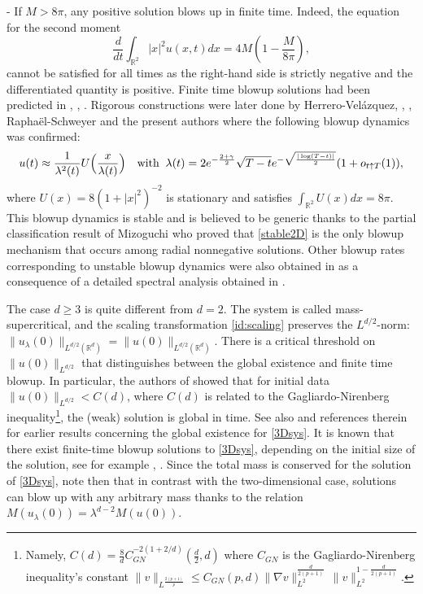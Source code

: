 \documentclass[11pt]{aims}
\theoremstyle{definition}
\newcommand{\Rb}{\mathbb{R}}
\numberwithin{equation}{section}
\begin{document}
- If $M > 8\pi$, any positive solution blows up in finite time. Indeed, the equation for the second moment
$$\frac{d}{dt}\int_{\Rb^2} |x|^2 u(x,t)dx =  4M \left( 1 - \frac{M}{8\pi}\right),$$
cannot be satisfied for all times as the right-hand side is strictly negative and the differentiated quantity is positive. Finite time blowup solutions had been predicted in \cite{Njtb73}, \cite{CPmb81}, \cite{JLtams92}. Rigorous constructions were later done by Herrero-Vel{\'a}zquez, \cite{HVma96}, \cite{Vsiam02}, Rapha\"el-Schweyer \cite{RSma14} and the present authors \cite{CGNNcpam21} where  the following blowup dynamics was confirmed:
\begin{equation}\label{stable2D}
u(t) \approx \frac{1}{\lambda^{2}(t)} U\Big( \frac{x}{\lambda(t)} \Big) \quad \textup{with}\;\; \lambda(t) = 2e^{-\frac{2+ \gamma}{2}}\sqrt{T-t}e^{-\sqrt{\frac{|\log (T-t)|}{2}}} (1 + o_{t \uparrow T}(1)),
\end{equation}
where $U(x) = 8(1 + |x|^2)^{-2}$ is stationary and satisfies $\int_{\Rb^2} U(x)dx = 8\pi$. This blowup dynamics is stable and is believed to be generic thanks to the partial classification result of Mizoguchi \cite{Mcpam20} who proved that \eqref{stable2D} is the only blowup mechanism that occurs among radial nonnegative solutions. Other blowup rates corresponding to unstable blowup dynamics were also obtained in \cite{CGNNcpam21} as a consequence of a detailed spectral analysis obtained in \cite{CGNNarx19a}.  

\bigskip

\noindent The case $d \geq 3$ is quite different from $d = 2$. The system is called mass-supercritical, and the scaling transformation \eqref{id:scaling} preserves the $L^{d/2}$-norm: $\|u_\lambda(0)\|_{L^{d/2}(\Rb^d)} = \|u(0)\|_{L^{d/2}(\Rb^d)}$. There is a critical threshold on $\| u(0)\|_{L^{d/2}}$ that distinguishes between the global existence and finite time blowup. In particular, the authors of \cite{CCEcpde12} showed that for initial data $\|u(0)\|_{L^{d/2}} < C(d)$, where $C(d)$ is related to the Gagliardo-Nirenberg inequality\footnote{Namely, $C(d)=\frac{8}{d} C_{GN}^{-2(1 + 2/d)}(\frac d2,d)$ where $C_{GN}$ is the Gagliardo-Nirenberg inequality's constant $\|v\|_{L^{ \frac{2(p+1)}{p} }} \leq C_{GN}(p,d) \|\nabla v\|_{L^2}^\frac{d}{2(p+1)} \, \|v\|_{L^2}^{1 - \frac{d}{2(p+1)}}$.}, the (weak) solution is global in time. See also \cite{CPZmjm04} and references therein for earlier results concerning the global existence for \eqref{3Dsys}. It is known that there exist finite-time blowup solutions to \eqref{3Dsys}, depending on the initial size of the solution, see for example \cite{BKZnonl15}, \cite{CPZmjm04}. Since the total mass is conserved for the solution of \eqref{3Dsys}, note then that in contrast with the two-dimensional case, solutions can blow up with any arbitrary mass 
thanks to the relation $M(u_\lambda(0)) = \lambda^{d-2}M(u(0)).$
 
\end{document}
